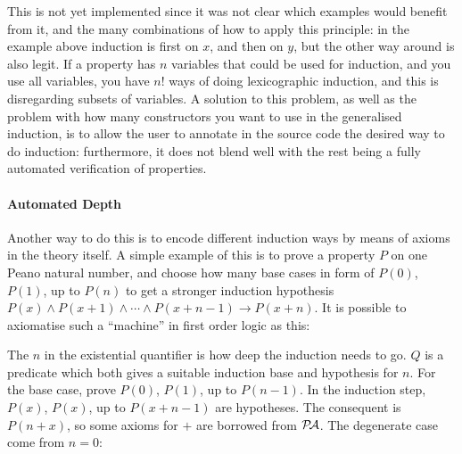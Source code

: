 This is not yet implemented since it was not clear which examples
would benefit from it, and the many combinations of how to apply this
principle: in the example above induction is first on $x$, and then on
$y$, but the other way around is also legit. If a property has $n$
variables that could be used for induction, and you use all variables,
you have $n!$ ways of doing lexicographic induction, and this is
disregarding subsets of variables.  A solution to this problem, as
well as the problem with how many constructors you want to use in the
generalised induction, is to allow the user to annotate in the source
code the desired way to do induction: furthermore, it does not blend
well with the rest being a fully automated verification of properties.


\paragraph{Automated Depth}
Another way to do this is to encode different induction ways by means
of axioms in the theory itself. A simple example of this is to prove a
property $P$ on one Peano natural number, and choose how many base
cases in form of $P(0)$, $P(1)$, up to $P(n)$ to get a stronger
induction hypothesis $P(x)\wedge P(x+1)\wedge \cdots\wedge
P(x+n-1)\rightarrow P(x+n)$. It is possible to axiomatise such a
``machine'' in first order logic as this:

\newcommand{\QZ}[2]{\inferrule* [left=q-0]{ }{Q(#1,#2)}}
\newcommand{\QS}[3]{\inferrule* [left=q-s]{P(#2) \and #3}{Q(#1,#2)}}
\newcommand{\IPZ}[2]{\inferrule* [left=+-0]{#1}{#2}}
\newcommand{\IPS}[2]{\inferrule* [left=+-s]{#1}{#2}}


The $n$ in the existential quantifier is how deep the induction needs
to go. $Q$ is a predicate which both gives a suitable induction base
and hypothesis for $n$. For the base case, prove $P(0)$, $P(1)$, up to
$P(n-1)$. In the induction step,$P(x)$, $P(x)$, up to $P(x+n-1)$ are
hypotheses. The consequent is $P(n+x)$, so some axioms for $+$ are
borrowed from $\mathcal{P\!A}$. The degenerate case come from $n=0$:


